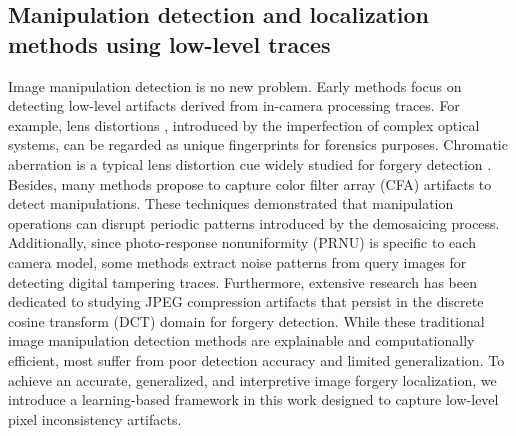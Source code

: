 \documentclass[10pt,journal,compsoc]{IEEEtran}
\begin{document}
\subsection{Manipulation detection and localization methods using low-level traces}  Image manipulation detection is no new problem. Early methods focus on detecting low-level artifacts derived from in-camera processing traces. For example, lens distortions \cite{mayer2018accurate, yerushalmy2011digital, johnson2006exposing, yerushalmy2011digital, gloe2010efficient, fu2012forgery}, introduced by the imperfection of complex optical systems, can be regarded as unique fingerprints for forensics purposes. Chromatic aberration is a typical lens distortion cue widely studied for forgery detection \cite{johnson2006exposing, yerushalmy2011digital, mayer2018accurate}. Besides, many methods \cite{ferrara2012image, popescu2005exposing, cao2009accurate, cao2009accurate2} propose to capture color filter array (CFA) artifacts to detect manipulations. These techniques demonstrated that manipulation operations can disrupt periodic patterns introduced by the demosaicing process. Additionally, since photo-response nonuniformity (PRNU) is specific to each camera model, some methods \cite{lyu2014exposing, mahdian2009using, kobayashi2010detecting} extract noise patterns from query images for detecting digital tampering traces. 
Furthermore, extensive research has been dedicated to studying JPEG compression artifacts that persist in the discrete cosine transform (DCT) domain \cite{chen2011detecting, farid2009exposing, fan2003identification, bianchi2012image, pasquini2017statistical} for forgery detection. While these traditional image manipulation detection methods are explainable and computationally efficient, most suffer from poor detection accuracy and limited generalization. 
To achieve an accurate, generalized, and interpretive image forgery localization, we introduce a learning-based framework in this work designed to capture low-level pixel inconsistency artifacts.
\end{document}
